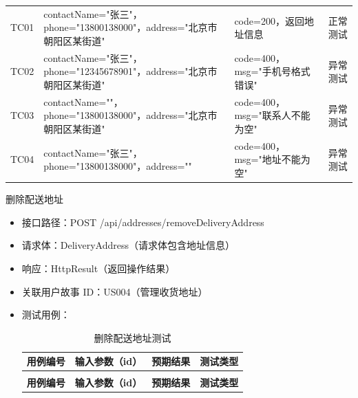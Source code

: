 \begin{levellist}
\begin{levellist}
\begin{itemize}
\begin{longtable}{>{\centering\arraybackslash}m{1.7cm} >{\centering\arraybackslash}m{6cm} >{\centering\arraybackslash}m{3.5cm} >{\centering\arraybackslash}m{1.8cm}}
                      \bottomrule
                      \endfoot

                      TC01          & contactName="张三"，phone="13800138000"，address="北京市朝阳区某街道" & code=200，返回地址信息        & 正常测试          \\
                      TC02          & contactName="张三"，phone="12345678901"，address="北京市朝阳区某街道" & code=400，msg="手机号格式错误" & 异常测试          \\
                      TC03          & contactName=""，phone="13800138000"，address="北京市朝阳区某街道"   & code=400，msg="联系人不能为空" & 异常测试          \\
                      TC04          & contactName="张三"，phone="13800138000"，address=""          & code=400，msg="地址不能为空"  & 异常测试          \\
                  \end{longtable}
        \end{itemize}


        \item 删除配送地址
        \begin{itemize}
            \item 接口路径：POST /api/addresses/removeDeliveryAddress
            \item 请求体：DeliveryAddress（请求体包含地址信息）
            \item 响应：HttpResult（返回操作结果）
            \item 关联用户故事 ID：US004（管理收货地址）
            \item 测试用例：
                  \begin{longtable}{>{\centering\arraybackslash}m{1.7cm} >{\centering\arraybackslash}m{3cm} >{\centering\arraybackslash}m{6.3cm} >{\centering\arraybackslash}m{2cm}}

                      \caption{删除配送地址测试} \label{tab:training}                                  \\

                      \toprule
                      \textbf{用例编号} & \textbf{输入参数（id）} & \textbf{预期结果}        & \textbf{测试类型} \\
                      \midrule
                      \endfirsthead

                      \multicolumn{4}{c}{{\tablename\ \thetable{} 续表}}                         \\
                      \toprule
                      \textbf{用例编号} & \textbf{输入参数（id）} & \textbf{预期结果}        & \textbf{测试类型} \\
                      \midrule
                      \endhead


\end{longtable}
\end{itemize}
\end{levellist}
\end{levellist}
